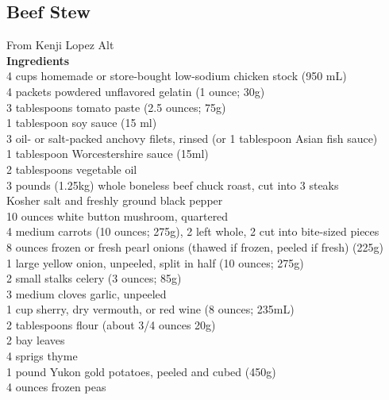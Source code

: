 \documentclass{article}
\numberwithin{figure}{section}
\numberwithin{equation}{section}
\begin{document}
\pagebreak
\subsection{Beef Stew}
From Kenji Lopez Alt\\

{\bf Ingredients}\\
4 cups homemade or store-bought low-sodium chicken stock (950 mL)\\
4 packets powdered unflavored gelatin (1 ounce; 30g)\\
3 tablespoons tomato paste (2.5 ounces; 75g)\\
1 tablespoon soy sauce (15 ml)\\
3 oil- or salt-packed anchovy filets, rinsed (or 1 tablespoon Asian fish sauce)\\
1 tablespoon Worcestershire sauce (15ml)\\
2 tablespoons vegetable oil\\
3 pounds (1.25kg) whole boneless beef chuck roast, cut into 3 steaks\\
Kosher salt and freshly ground black pepper\\
10 ounces white button mushroom, quartered\\
4 medium carrots (10 ounces; 275g), 2 left whole, 2 cut into bite-sized pieces\\
8 ounces frozen or fresh pearl onions (thawed if frozen, peeled if fresh) (225g)\\
1 large yellow onion, unpeeled, split in half (10 ounces; 275g)\\
2 small stalks celery (3 ounces; 85g)\\
3 medium cloves garlic, unpeeled\\
1 cup sherry, dry vermouth, or red wine (8 ounces; 235mL)\\
2 tablespoons flour (about 3/4 ounces 20g)\\
2 bay leaves\\
4 sprigs thyme\\
1 pound Yukon gold potatoes, peeled and cubed (450g)\\
4 ounces frozen peas\\
\end{document}

